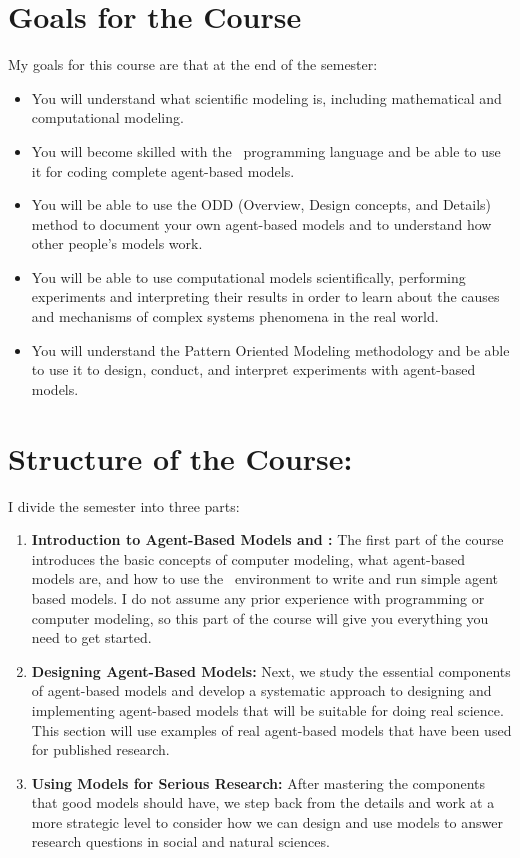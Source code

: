 \documentclass[11pt,twoside]{jgsyllabus}\usepackage[]{graphicx}\usepackage[]{xcolor}
\begin{document}
\iftrue
\section[Goals]{Goals for the Course}
My goals for this course are that at the end of the semester:
\begin{itemize}
    \item You will understand what scientific modeling is, including
    mathematical and computational modeling.
    \item You will become skilled with the \NetLogo\ programming language and
    be able to use it for coding complete agent-based models.
    \item You will be able to use the ODD (Overview, Design concepts, and
    Details) method to document your own agent-based models and to understand
    how other people's models work.
    \item You will be able to use computational models scientifically,
    performing experiments and interpreting their results in order to learn
    about the causes and mechanisms of complex systems phenomena in the real
    world.
    \item You will understand the Pattern Oriented Modeling methodology and be
    able to use it to design, conduct, and interpret experiments with
    agent-based models.
\end{itemize}
\fi
%
%
%
\clearpage
\section[Structure]{Structure of the Course:}
I divide the semester into three parts:
\begin{enumerate}
    \item \textbf{Introduction to Agent-Based Models and \NetLogo:} The first
    part of the course introduces the basic concepts of computer modeling, what
    agent-based models are, and how to use the \NetLogo\ environment to write
    and run simple agent based models. I do not assume any prior experience with
    programming or computer modeling, so this part of the course will give you
    everything you need to get started.
    \item \textbf{Designing Agent-Based Models:} Next, we study the essential
    components of agent-based models and develop a systematic approach to
    designing and implementing agent-based models that will be suitable for
    doing real science. This section will use examples of real agent-based
    models that have been used for published research.
    \item \textbf{Using Models for Serious Research:} After mastering the
    components that good models should have, we step back from the details and
    work at a more strategic level to consider how we can design  and use models
    to answer research questions in social and natural sciences.
\end{enumerate}
%
%
%
\end{document}
